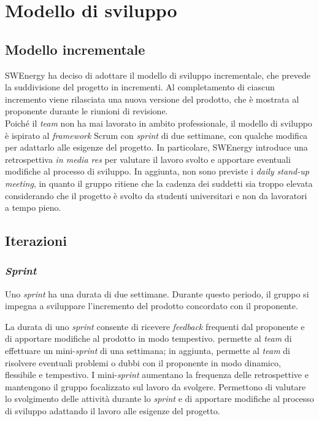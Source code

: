 \section{Modello di sviluppo}

\subsection{Modello incrementale}
SWEnergy ha deciso di adottare il modello di sviluppo incrementale, che prevede
la suddivisione del progetto in incrementi. Al completamento di ciascun
incremento viene rilasciata una nuova versione del prodotto, che è mostrata al
proponente durante le riunioni di revisione.\\
Poiché il \textit{team} non ha mai
lavorato in ambito professionale, il modello di sviluppo è ispirato al
\textit{framework} Scrum con \textit{sprint} di due settimane, con qualche
modifica per adattarlo alle esigenze del progetto. In particolare,
SWEnergy introduce una retrospettiva \textit{in media res} per valutare il
lavoro svolto e apportare eventuali modifiche al processo di sviluppo.
In aggiunta, non sono previste i \textit{daily stand-up meeting}, in quanto il
gruppo ritiene che la cadenza dei suddetti sia troppo elevata considerando
che il progetto è svolto da studenti universitari e non da lavoratori a tempo
pieno.

\subsection{Iterazioni}

\subsubsection{\textit{Sprint}}
Uno \textit{sprint} ha una durata di due settimane. Durante questo periodo, il
gruppo si impegna a sviluppare l'incremento del prodotto concordato con il
proponente.

La durata di uno \textit{sprint}
consente di ricevere \textit{feedback} frequenti dal proponente e di apportare
modifiche al prodotto in modo tempestivo.
permette al \textit{team} di effettuare un mini-\textit{sprint} di una
settimana;
in aggiunta, permette al \textit{team} di risolvere eventuali problemi o dubbi
con il proponente in modo dinamico, flessibile e tempestivo.
I mini-\textit{sprint} aumentano la frequenza delle retrospettive e mantengono
il gruppo focalizzato sul lavoro da svolgere. Permettono di valutare lo
svolgimento delle attività durante lo \textit{sprint} e di apportare modifiche
al processo di sviluppo adattando il lavoro alle esigenze del progetto.

